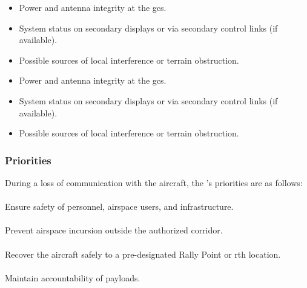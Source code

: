                 \begin{itemize}
                     
                    \item Power and antenna integrity at the \ac{gcs}.
                    
                    \item System status on secondary displays or via secondary control links (if available).
                    
                    \item Possible sources of local interference or terrain obstruction.
                    \item Power and antenna integrity at the \ac{gcs}.
                    
                    \item System status on secondary displays or via secondary control links (if available).
                    
                    \item Possible sources of local interference or terrain obstruction.
                    
                \end{itemize}
                    
            \subsubsection{Priorities} During a loss of communication with the aircraft, the 's priorities are as follows:
        
                \paragraph{}Ensure safety of personnel, airspace users, and  infrastructure.

                \paragraph{}Prevent airspace incursion outside the authorized corridor.

                \paragraph{}Recover the aircraft safely to a pre-designated Rally Point or \ac{rth} location.

                \paragraph{}Maintain accountability of payloads.

